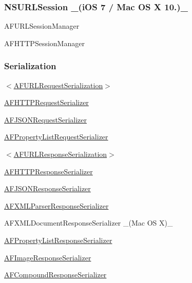 \subsubsection*{N\+S\+U\+R\+L\+Session \+\_\+(i\+OS 7 / Mac OS X 10.)\+\_\+}


\begin{DoxyItemize}
\item {\ttfamily A\+F\+U\+R\+L\+Session\+Manager}
\item {\ttfamily A\+F\+H\+T\+T\+P\+Session\+Manager}
\end{DoxyItemize}

\subsubsection*{Serialization}


\begin{DoxyItemize}
\item {\ttfamily $<$\mbox{\hyperlink{class_a_f_u_r_l_request_serialization-p}{A\+F\+U\+R\+L\+Request\+Serialization}}$>$}
\begin{DoxyItemize}
\item {\ttfamily \mbox{\hyperlink{interface_a_f_h_t_t_p_request_serializer}{A\+F\+H\+T\+T\+P\+Request\+Serializer}}}
\item {\ttfamily \mbox{\hyperlink{interface_a_f_j_s_o_n_request_serializer}{A\+F\+J\+S\+O\+N\+Request\+Serializer}}}
\item {\ttfamily \mbox{\hyperlink{interface_a_f_property_list_request_serializer}{A\+F\+Property\+List\+Request\+Serializer}}}
\end{DoxyItemize}
\item {\ttfamily $<$\mbox{\hyperlink{class_a_f_u_r_l_response_serialization-p}{A\+F\+U\+R\+L\+Response\+Serialization}}$>$}
\begin{DoxyItemize}
\item {\ttfamily \mbox{\hyperlink{interface_a_f_h_t_t_p_response_serializer}{A\+F\+H\+T\+T\+P\+Response\+Serializer}}}
\item {\ttfamily \mbox{\hyperlink{interface_a_f_j_s_o_n_response_serializer}{A\+F\+J\+S\+O\+N\+Response\+Serializer}}}
\item {\ttfamily \mbox{\hyperlink{interface_a_f_x_m_l_parser_response_serializer}{A\+F\+X\+M\+L\+Parser\+Response\+Serializer}}}
\item {\ttfamily A\+F\+X\+M\+L\+Document\+Response\+Serializer} \+\_\+(\+Mac O\+S X)\+\_\+
\item {\ttfamily \mbox{\hyperlink{interface_a_f_property_list_response_serializer}{A\+F\+Property\+List\+Response\+Serializer}}}
\item {\ttfamily \mbox{\hyperlink{interface_a_f_image_response_serializer}{A\+F\+Image\+Response\+Serializer}}}
\item {\ttfamily \mbox{\hyperlink{interface_a_f_compound_response_serializer}{A\+F\+Compound\+Response\+Serializer}}}
\end{DoxyItemize}
\end{DoxyItemize}

